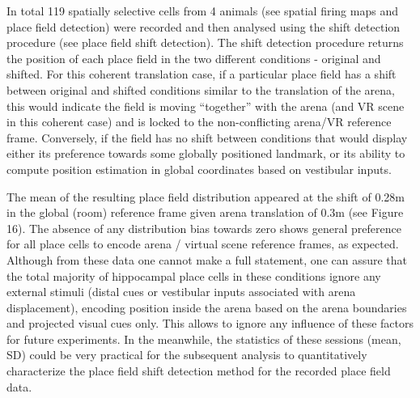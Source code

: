 In total 119 spatially selective cells from 4 animals (see spatial firing maps and place field detection) were recorded and then analysed using the shift detection procedure (see place field shift detection). The shift detection procedure returns the position of each place field in the two different conditions - original and shifted. For this coherent translation case, if a particular place field has a shift between original and shifted conditions similar to the translation of the arena, this would indicate the field is moving “together” with the arena (and VR scene in this coherent case) and is locked to the non-conflicting arena/VR reference frame. Conversely, if the field has no shift between conditions that would display either its preference towards some globally positioned landmark, or its ability to compute  position estimation in global coordinates based on vestibular inputs.

The mean of the resulting place field distribution appeared at the shift of 0.28m in the global (room) reference frame given arena translation of 0.3m (see Figure 16). The absence of any distribution bias towards zero shows general preference for all place cells to encode arena / virtual scene reference frames, as expected. Although from these data one cannot make a full statement, one can assure that the total majority of hippocampal place cells in these conditions ignore any external stimuli (distal cues or vestibular inputs associated with arena displacement), encoding position inside the arena based on the arena boundaries and projected visual cues only. This allows to ignore any influence of these factors for future experiments. In the meanwhile, the statistics of these sessions (mean, SD) could be very practical for the subsequent analysis to quantitatively characterize the place field shift detection method for the recorded place field data.

